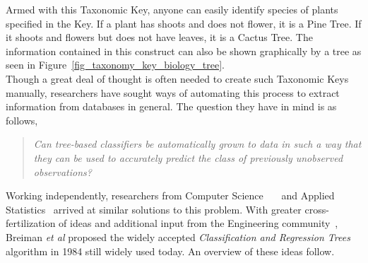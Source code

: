 Armed with this Taxonomic Key, anyone can easily identify species of plants specified in the Key. If a plant has shoots and does not flower, it is a Pine Tree. If it shoots and flowers but does not have leaves, it is a Cactus Tree. The information contained in this construct can also be shown graphically by a tree as seen in Figure~\ref{fig_taxonomy_key_biology_tree}.\\

Though a great deal of thought is often needed to create such Taxonomic Keys manually, researchers have sought ways of automating this process to extract information from databases in general. The question they have in mind is as follows,
\begin{quote}
\emph{Can tree-based classifiers be automatically grown to data in such a way that they can be used to accurately predict the class of previously unobserved observations?}
\end{quote}
Working independently, researchers from Computer Science~\cite{Quinlan.86}~\cite{Quinlan.88}~\cite{Quinlan.90} and Applied Statistics~\cite{cart84-2} arrived at similar solutions to this problem. With greater cross-fertilization of ideas and additional input from the Engineering community~\cite{Sethi.Sarvarayudu.82}, Breiman \emph{et al} proposed the widely accepted \emph{Classification and Regression Trees} algorithm in 1984 still widely used today. An overview of these ideas follow.


